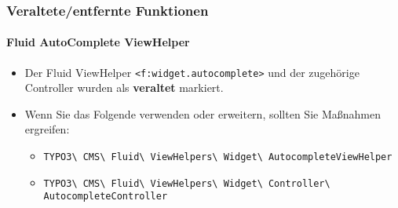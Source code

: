 \begin{frame}[fragile]
	\frametitle{Veraltete/entfernte Funktionen}
	\framesubtitle{Fluid AutoComplete ViewHelper}

	\begin{itemize}
		\item Der Fluid ViewHelper \texttt{<f:widget.autocomplete>} und der zugehörige Controller
			wurden als \textbf{veraltet} markiert.
		\item Wenn Sie das Folgende verwenden oder erweitern, sollten Sie Maßnahmen ergreifen:

			\begin{itemize}\smaller
				\item \texttt{TYPO3\textbackslash
					CMS\textbackslash
					Fluid\textbackslash
					ViewHelpers\textbackslash
					Widget\textbackslash
					AutocompleteViewHelper}
				\item \texttt{TYPO3\textbackslash
					CMS\textbackslash
					Fluid\textbackslash
					ViewHelpers\textbackslash
					Widget\textbackslash
					Controller\textbackslash
					AutocompleteController}
			\end{itemize}

	\end{itemize}

\end{frame}


